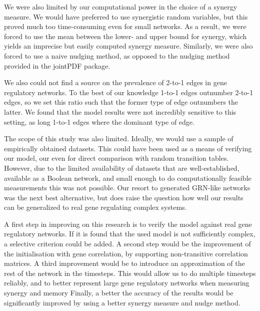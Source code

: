\documentclass[../main.tex]{subfiles}
\begin{document}
We were also limited by our computational power in the choice of a synergy measure.
We would have preferred to use synergistic random variables, but this proved much too time-consuming even for small networks.
As a result, we were forced to use the mean between the lower- and upper bound for synergy, which yields an imprecise but easily computed synergy measure.
Similarly, we were also forced to use a naive nudging method, as opposed to the nudging method provided in the jointPDF package.

We also could not find a source on the prevalence of 2-to-1 edges in gene regulatory networks.
To the best of our knowledge 1-to-1 edges outnumber 2-to-1 edges, so we set this ratio such that the former type of edge outnumbers the latter.
We found that the model results were not incredibly sensitive to this setting, as long 1-to-1 edges where the dominant type of edge.

The scope of this study was also limited.
Ideally, we would use a sample of empirically obtained datasets.
This could have been used as a means of verifying our model, our even for direct comparison with random transition tables. %
However, due to the limited availability of datasets that are well-established, available as a Boolean network, and small enough to do computationally feasible measurements this was not possible.
Our resort to generated GRN-like networks was the next best alternative, but does raise the question how well our results can be generalized to real gene regulating complex systems.


A first step in improving on this research is to verify the model against real gene regulatory networks.
If it is found that the used model is not sufficiently complex, a selective criterion could be added.
A second step would be the improvement of the initialisation with gene correlation, by supporting non-transitive correlation matrices.
A third improvement would be to introduce an approximation of the rest of the network in the timesteps.
This would allow us to do multiple timesteps reliably, and to better represent large gene regulatory networks when measuring synergy and memory %
Finally, a better the accuracy of the results would be significantly improved by using a better synergy measure and nudge method.

\end{document}
